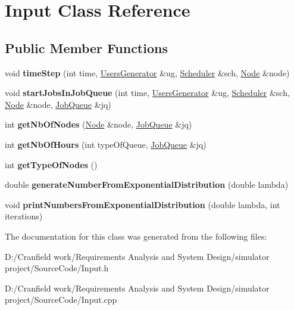 \hypertarget{class_input}{}\section{Input Class Reference}
\label{class_input}
\subsection*{Public Member Functions}
\begin{DoxyCompactItemize}
\item 
\mbox{\label{class_input_a1ee522db7c8b3cc5507e62d057ca5752}} 
void {\bfseries time\+Step} (int time, \mbox{\hyperlink{class_users_generator}{Users\+Generator}} \&ug, \mbox{\hyperlink{class_scheduler}{Scheduler}} \&sch, \mbox{\hyperlink{class_node}{Node}} \&node)
\item 
\mbox{\label{class_input_a12350cbbc8bcdcaf38bfc3562b7f4a97}} 
void {\bfseries start\+Jobs\+In\+Job\+Queue} (int time, \mbox{\hyperlink{class_users_generator}{Users\+Generator}} \&ug, \mbox{\hyperlink{class_scheduler}{Scheduler}} \&sch, \mbox{\hyperlink{class_node}{Node}} \&node, \mbox{\hyperlink{class_job_queue}{Job\+Queue}} \&jq)
\item 
\mbox{\label{class_input_a5572ea662861b5f294195782ad953bf1}} 
int {\bfseries get\+Nb\+Of\+Nodes} (\mbox{\hyperlink{class_node}{Node}} \&node, \mbox{\hyperlink{class_job_queue}{Job\+Queue}} \&jq)
\item 
\mbox{\label{class_input_af91640b0926d1c88baae2561c1aadc5f}} 
int {\bfseries get\+Nb\+Of\+Hours} (int type\+Of\+Queue, \mbox{\hyperlink{class_job_queue}{Job\+Queue}} \&jq)
\item 
\mbox{\label{class_input_afa75d3fd99706a00c2847a324fefcd92}} 
int {\bfseries get\+Type\+Of\+Nodes} ()
\item 
\mbox{\label{class_input_ad4c4aa38487074bee3503ee4b8b40ef8}} 
double {\bfseries generate\+Number\+From\+Exponential\+Distribution} (double lambda)
\item 
\mbox{\label{class_input_a2773675737b827a2f55d482b06fbcfd1}} 
void {\bfseries print\+Numbers\+From\+Exponential\+Distribution} (double lambda, int iterations)
\end{DoxyCompactItemize}


The documentation for this class was generated from the following files\+:\begin{DoxyCompactItemize}
\item 
D\+:/\+Cranfield work/\+Requirements Analysis and System Design/simulator project/\+Source\+Code/Input.\+h\item 
D\+:/\+Cranfield work/\+Requirements Analysis and System Design/simulator project/\+Source\+Code/Input.\+cpp\end{DoxyCompactItemize}
